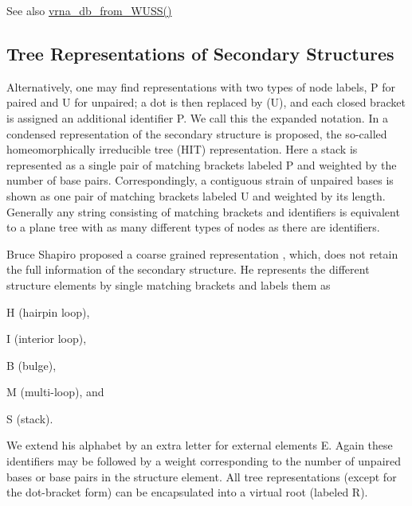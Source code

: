 \begin{DoxySeeAlso}{See also}
\mbox{\hyperlink{group__struct__utils__dot__bracket_ga02ca70cffb2d864f7b2d95d92218bae0}{vrna\+\_\+db\+\_\+from\+\_\+\+W\+U\+S\+S()}}
\end{DoxySeeAlso}
\hypertarget{rna_structure_notations_sec_structure_representations_tree}{}\subsection{Tree Representations of Secondary Structures}\label{rna_structure_notations_sec_structure_representations_tree}
Alternatively, one may find representations with two types of node labels, \textquotesingle{}P\textquotesingle{} for paired and \textquotesingle{}U\textquotesingle{} for unpaired; a dot is then replaced by \textquotesingle{}(U)\textquotesingle{}, and each closed bracket is assigned an additional identifier \textquotesingle{}P\textquotesingle{}. We call this the expanded notation. In \cite{fontana:1993b} a condensed representation of the secondary structure is proposed, the so-\/called homeomorphically irreducible tree (H\+IT) representation. Here a stack is represented as a single pair of matching brackets labeled \textquotesingle{}P\textquotesingle{} and weighted by the number of base pairs. Correspondingly, a contiguous strain of unpaired bases is shown as one pair of matching brackets labeled \textquotesingle{}U\textquotesingle{} and weighted by its length. Generally any string consisting of matching brackets and identifiers is equivalent to a plane tree with as many different types of nodes as there are identifiers.

Bruce Shapiro proposed a coarse grained representation \cite{shapiro:1988}, which, does not retain the full information of the secondary structure. He represents the different structure elements by single matching brackets and labels them as


\begin{DoxyItemize}
\item {\ttfamily H} (hairpin loop),
\item {\ttfamily I} (interior loop),
\item {\ttfamily B} (bulge),
\item {\ttfamily M} (multi-\/loop), and
\item {\ttfamily S} (stack).
\end{DoxyItemize}

We extend his alphabet by an extra letter for external elements {\ttfamily E}. Again these identifiers may be followed by a weight corresponding to the number of unpaired bases or base pairs in the structure element. All tree representations (except for the dot-\/bracket form) can be encapsulated into a virtual root (labeled {\ttfamily R}).

